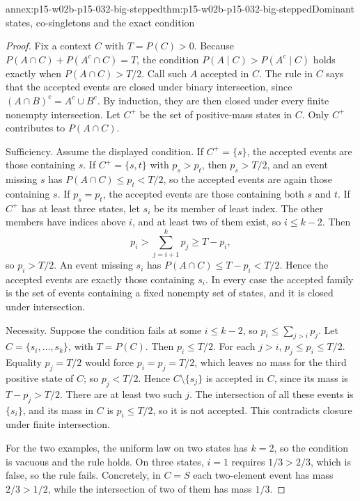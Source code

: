 \begin{annexitem}{annex:p15-w02b-p15-032-big-stepped}{thm:p15-w02b-p15-032-big-stepped}{Dominant states, co-singletons and the exact condition}
\begin{proof}
Fix a context \(C\) with \(T=P(C)>0\). Because
\(P(A\cap C)+P(A^c\cap C)=T\), the condition \(P(A\mid C)>P(A^c\mid C)\)
holds exactly when \(P(A\cap C)>T/2\). Call such \(A\) accepted in \(C\).
The rule in \(C\) says that the accepted events are closed under binary
intersection, since \((A\cap B)^c=A^c\cup B^c\). By induction, they are then
closed under every finite nonempty intersection. Let \(C^+\) be the set of
positive-mass states in \(C\). Only \(C^+\) contributes to \(P(A\cap C)\).

Sufficiency. Assume the displayed condition. If \(C^+=\{s\}\), the accepted
events are those containing \(s\). If \(C^+=\{s,t\}\) with \(p_s>p_t\), then
\(p_s>T/2\), and an event missing \(s\) has \(P(A\cap C)\leq p_t<T/2\), so the
accepted events are again those containing \(s\). If \(p_s=p_t\), the accepted
events are those containing both \(s\) and \(t\). If \(C^+\) has at least three
states, let \(s_i\) be its member of least index. The other members have
indices above \(i\), and at least two of them exist, so \(i\leq k-2\). Then
\[
 p_i>\sum_{j=i+1}^kp_j\geq T-p_i ,
\]
so \(p_i>T/2\). An event missing \(s_i\) has \(P(A\cap C)\leq T-p_i<T/2\).
Hence the accepted events are exactly those containing \(s_i\). In every
case the accepted family is the set of events containing a fixed nonempty
set of states, and it is closed under intersection.

Necessity. Suppose the condition fails at some \(i\leq k-2\), so
\(p_i\leq\sum_{j>i}p_j\). Let \(C=\{s_i,\ldots,s_k\}\), with \(T=P(C)\). Then
\(p_i\leq T/2\). For each \(j>i\), \(p_j\leq p_i\leq T/2\). Equality
\(p_j=T/2\) would force \(p_i=p_j=T/2\), which leaves no mass for the third
positive state of \(C\); so \(p_j<T/2\). Hence \(C\setminus\{s_j\}\) is
accepted in \(C\), since its mass is \(T-p_j>T/2\). There are at least two
such \(j\). The intersection of all these events is \(\{s_i\}\), and its mass in \(C\) is \(p_i\leq T/2\), so it is not
accepted. This contradicts closure under finite intersection.

For the two examples, the uniform law on two states has \(k=2\), so the
condition is vacuous and the rule holds. On three states, \(i=1\) requires
\(1/3>2/3\), which is false, so the rule fails. Concretely, in \(C=S\) each
two-element event has mass \(2/3>1/2\), while the intersection of two of them
has mass \(1/3\).
\end{proof}\end{annexitem}
